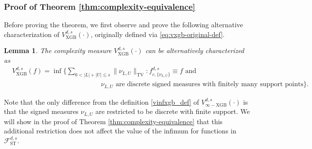 \documentclass[10pt]{article}
\newtheorem{lemma}{Lemma}
\newcommand{\fst}{{\mathcal{F}^{d, s}_{\text{ST}}}}
\newcommand{\vxgb}{{V^{d, s}_{\text{XGB}}}}
\newcommand{\vinfxgb}{{V^{d, s}_{\infty-\text{XGB}}}}
\newcommand{\fcnu}{{f^{d, s}_{c, \{\nu_{L, U}\}}}}
\begin{document}
\subsubsection{Proof of Theorem \ref{thm:complexity-equivalence}}
\label{pf:complexity-equivalence}
Before proving the theorem, we first observe and prove the following 
alternative characterization of $\vxgb(\cdot)$, originally defined 
via \eqref{eq:vxgb-original-def}.

\begin{lemma}\label{lem:alt-charac-vxgb}
    The complexity measure $\vxgb(\cdot)$ can be alternatively 
    characterized as
    \begin{equation*}
    \begin{aligned}
        &\vxgb(f) = \inf \bigg\{
        \sum_{0 < |L| + |U| \le s} \|\nu_{L, U}\|_{\text{TV}}: 
        \fcnu \equiv f \text{ and } \\
        &\qquad \qquad \qquad \qquad \qquad \qquad \quad
        \nu_{L, U} \text{ are discrete signed measures with 
        finitely many support points} \bigg\}.
    \end{aligned}
    \end{equation*}
\end{lemma}

Note that the only difference from the definition \eqref{vinfxgb_def} 
of $\vinfxgb(\cdot)$ is that the signed measures $\nu_{L, U}$ are 
restricted to be discrete with finite support. We will show in the 
proof of Theorem \ref{thm:complexity-equivalence} that this 
additional restriction does not affect the value of the infimum for 
functions in $\fst$.
\end{document}
